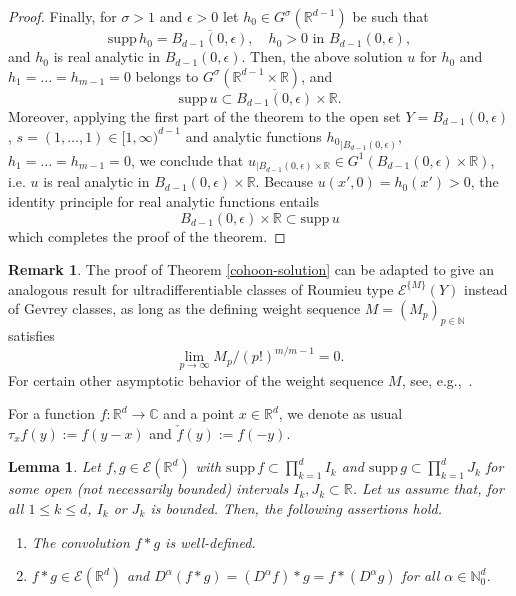 \documentclass[a4paper,10pt]{amsart}
\newtheorem{lemma}[theorem]{Lemma}
\newtheorem*{crucial lemma}{Lemma \ref{lem:nice polynomial2}}
\theoremstyle{definition}
\newtheorem{remark}[theorem]{Remark}
\newcommand{\R}{\mathbb{R}}
\newcommand{\C}{\mathbb{C}}
\newcommand{\N}{\mathbb{N}}
\newcommand{\supp}{\mbox{supp}\,}
\begin{document}
\begin{proof}
	Finally, for $\sigma>1$ and $\epsilon>0$ let $h_0\in G^\sigma(\R^{d-1})$ be such that
	\[\supp h_0= \overline{B_{d-1}(0,\epsilon)},\quad h_0> 0\text{ in }B_{d-1}(0,\epsilon),\]
	and $h_0$ is real analytic in $B_{d-1}(0,\epsilon)$. Then, the above solution $u$ for $h_0$ and $h_1=\ldots=h_{m-1}=0$ belongs to $G^\sigma(\R^{d-1}\times\R)$, and 
	\[\supp u\subset \overline{B_{d-1}(0,\epsilon)}\times \R.\]
    Moreover, applying the first part of the theorem to the open set $Y=B_{d-1}(0,\epsilon)$, $s=(1,\ldots,1)\in[1,\infty)^{d-1}$ and analytic functions ${h_0}_{\mid{B_{d-1}(0,\epsilon)}}$, $h_1=\ldots=h_{m-1}=0$, we conclude that $u_{\mid{B_{d-1}(0,\epsilon)\times\R}}\in G^1(B_{d-1}(0,\epsilon)\times\R)$, i.e. $u$ is real analytic in $B_{d-1}(0,\epsilon)\times\R$.
	Because $u(x',0)=h_0(x')>0$, the identity principle for real analytic functions entails
	\[B_{d-1}(0,\epsilon)\times\R\subset\supp u\]
    which completes the proof of the theorem.
\end{proof}

\begin{remark}\label{rem:cohoon-solution}
	The proof of Theorem \ref{cohoon-solution} can be adapted to give an analogous result for ultradifferentiable classes of Roumieu type $\mathscr{E}^{\{M\}}(Y)$ instead of Gevrey classes, as long as the defining weight sequence $M=(M_p)_{p\in\N}$ satisfies $$\lim_{p\rightarrow\infty}M_p/(p!)^{m/m-1}=0.$$
	For certain other asymptotic behavior of the weight sequence $M$, see, e.g.,~\cite[Sectiona 4]{DebKalmes2023}.
\end{remark}

For a function $f\colon\R^d\to\C$ and a point $x\in\R^d$, we denote as usual $\tau_x f(y):=f(y-x)$ and $\check f(y):=f(-y)$.
\begin{lemma}\label{lemma:convolution f ast g}
	Let $f,g\in \mathscr{E}(\R^d)$ with $\supp f\subset\prod_{k=1}^d I_k$ and $\supp g\subset\prod_{k=1}^d J_k$ for some open (not necessarily bounded) intervals $I_k,J_k\subset\R$. Let us assume that, for all $1\leq k\leq d$, $I_k$ or $J_k$ is bounded. Then, the following assertions hold.
	\begin{enumerate}[{\upshape(i)}]
		\item The convolution $f\ast g$ is well-defined.
		\item $f\ast g\in \mathscr{E}(\R^d)$ and $D^{\alpha}(f\ast g)=(D^{\alpha}f)\ast g=f\ast (D^{\alpha}g)$ for all $\alpha\in\N_0^d$.
	\end{enumerate}
\end{lemma}
\end{document}
